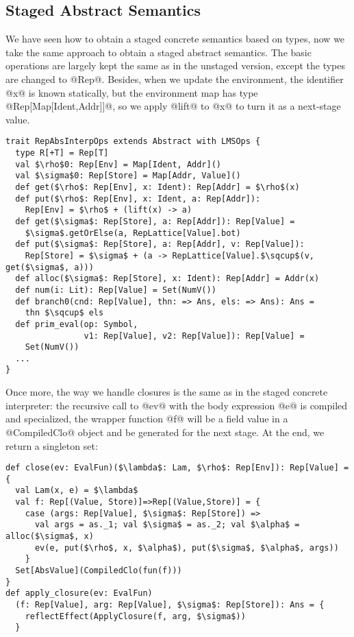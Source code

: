 \subsection{Staged Abstract Semantics}

We have seen how to obtain a staged concrete semantics based on types, now we
take the same approach to obtain a staged abstract semantics. The basic
operations are largely kept the same as in the unstaged version, except the
types are changed to @Rep@. Besides, when we update the environment, the
identifier @x@ is known statically, but the environment map has type
@Rep[Map[Ident,Addr]]@, so we apply @lift@ to @x@ to turn it as a next-stage
value.

\begin{lstlisting}
trait RepAbsInterpOps extends Abstract with LMSOps {
  type R[+T] = Rep[T]
  val $\rho$0: Rep[Env] = Map[Ident, Addr]()
  val $\sigma$0: Rep[Store] = Map[Addr, Value]()
  def get($\rho$: Rep[Env], x: Ident): Rep[Addr] = $\rho$(x)
  def put($\rho$: Rep[Env], x: Ident, a: Rep[Addr]): 
    Rep[Env] = $\rho$ + (lift(x) -> a)
  def get($\sigma$: Rep[Store], a: Rep[Addr]): Rep[Value] = 
    $\sigma$.getOrElse(a, RepLattice[Value].bot)
  def put($\sigma$: Rep[Store], a: Rep[Addr], v: Rep[Value]): 
    Rep[Store] = $\sigma$ + (a -> RepLattice[Value].$\sqcup$(v, get($\sigma$, a)))
  def alloc($\sigma$: Rep[Store], x: Ident): Rep[Addr] = Addr(x)
  def num(i: Lit): Rep[Value] = Set(NumV())
  def branch0(cnd: Rep[Value], thn: => Ans, els: => Ans): Ans =
    thn $\sqcup$ els
  def prim_eval(op: Symbol, 
                v1: Rep[Value], v2: Rep[Value]): Rep[Value] = 
    Set(NumV())
  ...
}
\end{lstlisting}

Once more, the way we handle closures is the same as in the staged concrete
interpreter: the recursive call to @ev@ with the body expression @e@ is compiled
and specialized, the wrapper function @f@ will be a field value in a
@CompiledClo@ object and be generated for the next stage. At the end, we return
a singleton set:

\begin{lstlisting}
def close(ev: EvalFun)($\lambda$: Lam, $\rho$: Rep[Env]): Rep[Value] = {
  val Lam(x, e) = $\lambda$
  val f: Rep[(Value, Store)]=>Rep[(Value,Store)] = {
    case (args: Rep[Value], $\sigma$: Rep[Store]) =>
      val args = as._1; val $\sigma$ = as._2; val $\alpha$ = alloc($\sigma$, x)
      ev(e, put($\rho$, x, $\alpha$), put($\sigma$, $\alpha$, args))
    }
  Set[AbsValue](CompiledClo(fun(f)))
}
def apply_closure(ev: EvalFun)
  (f: Rep[Value], arg: Rep[Value], $\sigma$: Rep[Store]): Ans = {
    reflectEffect(ApplyClosure(f, arg, $\sigma$))
  }
\end{lstlisting}

